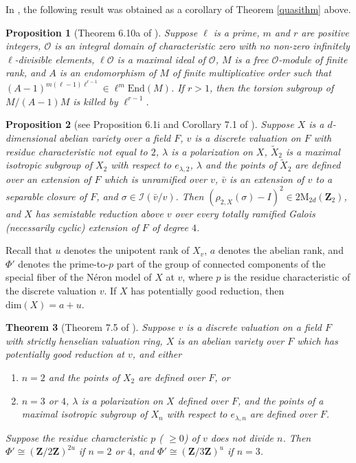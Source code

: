 \documentclass{amsart}
\def\Z{{\mathbf Z}}
\def\End{\mathrm{End}}
\def\I{{\mathcal I}}
\def\M{\mathrm{M}}
\def\dim{\mathrm{dim}}
\def\O{{\mathcal O}}
\newtheorem{thm}{Theorem}[section]
\newtheorem{prop}[thm]{Proposition}
\theoremstyle{definition}
\begin{document}
In \cite{serrelem}, the following result was obtained as
a corollary of Theorem \ref{quasithm} above.

\begin{prop}[Theorem 6.10a of \cite{serrelem}]
\label{randm}
Suppose $\ell$ is a prime, $m$ and $r$ are positive integers, $\O$ is an
integral domain of characteristic zero with no non-zero infinitely 
$\ell$-divisible elements, $\ell\O$ is a maximal ideal of $\O$, $M$ is
a free $\O$-module of finite rank, and $A$ is an endomorphism of $M$ 
of finite multiplicative order such that
$(A - 1)^{m(\ell - 1)\ell^{r-1}} \in \ell^m\End(M)$.  
If $r > 1$, then the torsion
subgroup of $M/(A - 1)M$ is killed by $\ell^{r-1}$.
\end{prop}

\begin{prop}[see Proposition 6.1i and Corollary 7.1 of \cite{semistab}]
\label{pressred}
Suppose $X$ is a $d$-dimensional abelian variety over a field $F$, 
$v$ is a discrete valuation on $F$ with residue characteristic 
not equal to $2$, 
$\lambda$ is a polarization on $X$,   
$\widetilde{X}_2$ is a maximal isotropic subgroup of $X_2$ with respect to 
$e_{\lambda,2}$, $\lambda$ and the points of 
$\widetilde{X}_2$ are defined over an extension of $F$ which is 
unramified over $v$, 
${\bar v}$ is an extension of $v$ to a separable closure of $F$, 
and $\sigma \in \I({\bar v}/v)$.
Then $(\rho_{2,X}(\sigma) - I)^2 \in 2\M_{2d}(\Z_2)$, 
and $X$ has semistable 
reduction above $v$ over every totally ramified Galois 
(necessarily cyclic) extension of $F$ of degree $4$.
\end{prop}

Recall that $u$ denotes the unipotent rank of $X_v$, $a$ denotes the
abelian rank, and 
 $\Phi '$ denotes the prime-to-$p$ part of the group of 
connected components of the special
fiber of the N\'eron model of $X$ at $v$, where $p$ is the residue 
characteristic of the discrete valuation $v$. If $X$ has potentially
good reduction, then $\dim(X) = a + u$.

\begin{thm}[Theorem 7.5 of \cite{semistab}]
\label{neronmod}
Suppose $v$ is a discrete valuation on a field $F$ with strictly henselian 
valuation ring, $X$ is an abelian 
variety over $F$ which has potentially good reduction at $v$, and either 
\begin{enumerate}
\item[{(a)}] $n = 2$ and the points of $X_2$
are defined over $F$, or
\item[{(b)}] $n = 3$ or $4$, $\lambda$ is a polarization on $X$ 
defined over $F$, and 
the points of a maximal isotropic subgroup of $X_n$ with respect to 
$e_{\lambda,n}$ are defined over $F$.
\end{enumerate}
Suppose the residue characteristic $p$ ( $\ge 0$) of $v$ does
not divide $n$. 
Then $\Phi ' \cong (\Z/2\Z)^{2u}$
if $n = 2$ or $4$, and $\Phi ' \cong (\Z/3\Z)^u$ if $n = 3$.
\end{thm}
\end{document}
